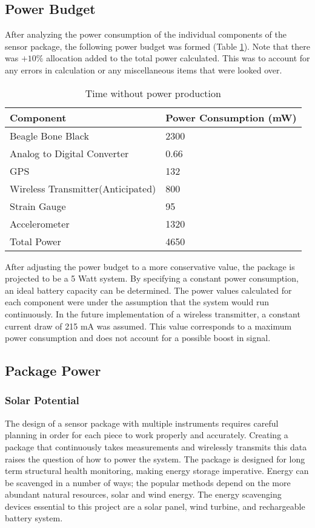 
\subsection{Power Budget}
\indent After analyzing the power consumption of the individual components of the sensor package, the following power budget was formed (Table \ref*{tab:PowerBudget}). Note that there was $+10\%$ allocation added to the total power calculated. This was to account for any errors in calculation or any miscellaneous items that were looked over. 

\begin{table}
\centering
\begin{tabular}{l|l|}\hline
Component & Power Consumption (mW)\\\hline
Beagle Bone Black & 2300\\\hline
Analog to Digital Converter & 0.66\\\hline
GPS & 132\\\hline
Wireless Transmitter(Anticipated) & 800\\\hline
Strain Gauge & 95\\\hline
Accelerometer & 1320\\\hline
Total Power & 4650

\end{tabular}
\caption{\label{tab:PowerBudget}Time without power production}
\end{table}

\indent After adjusting the power budget to a more conservative value, the package is projected to be a 5 Watt system. By specifying a constant power consumption, an ideal battery capacity can be determined. The power values calculated for each component were under the assumption that the system would run continuously. In the future implementation of a wireless transmitter, a constant current draw of 215 mA was assumed. This value corresponds to a maximum power consumption and does not account for a possible boost in signal. 


\subsection{Package Power}

\subsubsection{Solar Potential}

\indent The design of a sensor package with multiple instruments requires careful planning in order for each piece to work properly and accurately. Creating a package that continuously takes measurements and wirelessly transmits this data raises the question of how to power the system. The package is designed for long term structural health monitoring, making energy storage imperative.  Energy can be scavenged in a number of ways; the popular methods depend on the more abundant natural resources, solar and wind energy. The energy scavenging devices essential to this project are a solar panel, wind turbine, and rechargeable battery system.\\

